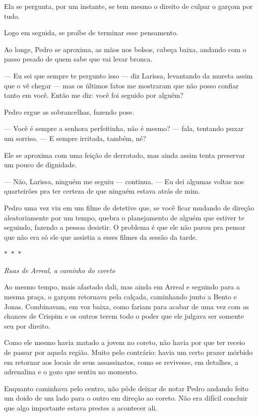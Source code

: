 Ela se pergunta, por um instante, se tem mesmo o direito de culpar o garçom por tudo.

Logo em seguida, se proíbe de terminar esse pensamento.

Ao longe, Pedro se aproxima, as mãos nos bolsos, cabeça baixa, andando com o passo pesado de quem sabe que vai levar bronca.

— Eu sei que sempre te pergunto isso — diz Larissa, levantando da mureta assim que o vê chegar — mas os últimos fatos me mostraram que não posso confiar tanto em você.  
Então me diz: você foi seguido por alguém?

Pedro ergue as sobrancelhas, fazendo pose.

— Você é sempre a senhora perfeitinha, não é mesmo? — fala, tentando puxar um sorriso. — E sempre irritada, também, né?

Ele se aproxima com uma feição de derrotado, mas ainda assim tenta preservar um pouco de dignidade.

— Não, Larissa, ninguém me seguiu — continua. — Eu dei algumas voltas nos quarteirões pra ter certeza de que ninguém estava atrás de mim.

Pedro uma vez viu em um filme de detetive que, se você ficar mudando de direção aleatoriamente por um tempo, quebra o planejamento de alguém que estiver te seguindo, fazendo a pessoa desistir.  
O problema é que ele não parou pra pensar que não era só ele que assistia a esses filmes da sessão da tarde.

\begin{center}
$\ast$~$\ast$~$\ast$

\textit{Ruas de Arreal, a caminho do coreto}
\end{center}

Ao mesmo tempo, mais afastado dali, mas ainda em Arreal e seguindo para a mesma praça, o garçom retornava pela calçada, caminhando junto a Bento e Jonas.
Combinavam, em voz baixa, como fariam para acabar de uma vez com as chances de Crispim e os outros terem todo o poder que ele julgava ser somente seu por direito.

Como ele mesmo havia matado a jovem no coreto, não havia por que ter receio de passar por aquela região. Muito pelo contrário: havia um certo prazer mórbido em retornar aos locais de seus assassinatos, como se revivesse, em detalhes, a adrenalina e o gozo que sentiu no momento.

Enquanto caminhava pelo centro, não pôde deixar de notar Pedro andando feito um doido de um lado para o outro em direção ao coreto.  
Não era difícil concluir que algo importante estava prestes a acontecer ali.

